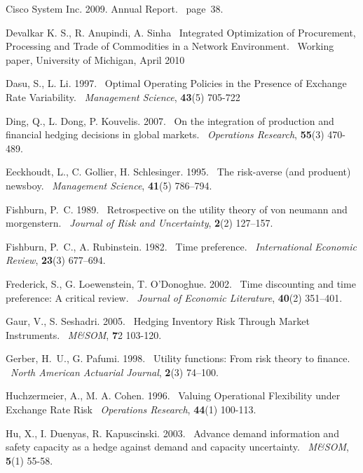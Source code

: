 \documentclass[mnsc,nonblindrev,copyedit]{informs2_wz} %
\def\newblock{\ }%
\begin{document}
\begin{thebibliography}{1}
Cisco System Inc. 2009. Annual Report.
\newblock page~38.



Devalkar K. S., R. Anupindi, A. Sinha
\newblock Integrated Optimization of Procurement, Processing and Trade of Commodities in a Network Environment.
\newblock Working paper, University of Michigan, April 2010


Dasu, S., L. Li. 1997.
\newblock Optimal Operating Policies in the Presence of Exchange Rate Variability.
\newblock {\em Management Science}, {\bf 43}(5) 705-722

Ding, Q., L. Dong, P. Kouvelis. 2007.
\newblock On the integration of production and financial hedging decisions in
  global markets.
\newblock {\em Operations Research}, {\bf 55}(3) 470-489.

Eeckhoudt, L., C. Gollier, H. Schlesinger. 1995.
\newblock The risk-averse (and produent) newsboy.
\newblock {\em Management Science}, {\bf 41}(5) 786--794.

Fishburn, P.~C. 1989.
\newblock Retrospective on the utility theory of von neumann and morgenstern.
\newblock {\em Journal of Risk and Uncertainty}, {\bf 2}(2) 127--157.

Fishburn, P.~C., A. Rubinstein. 1982.
\newblock Time preference.
\newblock {\em International Economic Review}, {\bf 23}(3) 677--694.

Frederick, S., G. Loewenstein, T. O'Donoghue. 2002.
\newblock Time discounting and time preference: A critical review.
\newblock {\em Journal of Economic Literature}, {\bf 40}(2) 351--401.

Gaur, V., S. Seshadri. 2005.
\newblock Hedging Inventory Risk Through Market Instruments.
\newblock {\em M\&SOM}, {\bf 7}{2} 103-120.

Gerber, H.~U., G. Pafumi. 1998.
\newblock Utility functions: From risk theory to finance.
\newblock {\em North American Actuarial Journal}, {\bf 2}(3) 74--100.

Huchzermeier, A., M. A. Cohen. 1996.
\newblock Valuing Operational Flexibility under Exchange Rate Risk
\newblock {\em Operations Research}, {\bf 44}(1) 100-113.

Hu, X., I. Duenyas, R. Kapuscinski. 2003.
\newblock Advance demand information and safety capacity as a hedge against
  demand and capacity uncertainty.
\newblock {\em M\&SOM}, {\bf 5}(1) 55-58.


\end{thebibliography}
\end{document}
